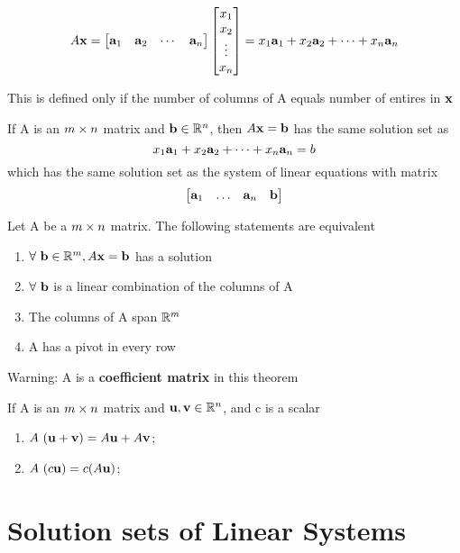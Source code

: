 \documentclass{report}
\begin{document}
\[
A \mathbf{x} = 
\begin{bmatrix}
\mathbf{a}_1 & \mathbf{a}_2 & \cdots & \mathbf{a}_n
\end{bmatrix}
\begin{bmatrix}
x_1 \\ x_2 \\ \vdots \\ x_n
\end{bmatrix}
= x_1 \mathbf{a}_1 + x_2 \mathbf{a}_2 + \cdots + x_n \mathbf{a}_n
\]

This is defined only if the number of columns of A equals number of entires in $\mathbf{x}$

\begin{theorem}
\end{theorem}
If A is an $m \times n$ matrix and $\mathbf{b} \in \mathbb{R}^n$, then $A \mathbf{x} = \mathbf{b}$ has the same solution set as 
\[
x_1 \mathbf{a}_1 + x_2 \mathbf{a}_2 + \cdots + x_n \mathbf{a}_n = b
\]
which has the same solution set as the system of linear equations with matrix
\[
\begin{bmatrix}
    \mathbf{a}_1 & \ldots & \mathbf{a}_n & \mathbf{b}
\end{bmatrix}
\]

\begin{theorem}
\end{theorem}
Let A be a $m \times n$ matrix. The following statements are equivalent
\begin{enumerate}[label=\alph*.]
    \item $\forall\ \mathbf{b} \in \mathbb{R}^m, A \mathbf{x} = \mathbf{b}$ has a solution
    \item $\forall\ \mathbf{b}$ is a linear combination of the columns of A
    \item The columns of A span $\mathbb{R}^m$
    \item A has a pivot in every row
\end{enumerate}
Warning: A is a \textbf{coefficient matrix} in this theorem

\begin{theorem}
\end{theorem}
If A is an $m \times n$ matrix and $\mathbf{u},\mathbf{v} \in \mathbb{R}^n$, and c is a scalar
\begin{enumerate}[label=\alph*.]
    \item $A\ (\mathbf{u} + \mathbf{v}) = A \mathbf{u} + A \mathbf{v}$;
    \item $A\ (c \mathbf{u}) = c (A \mathbf{u})$;
\end{enumerate}

\section{Solution sets of Linear Systems}
\end{document}
